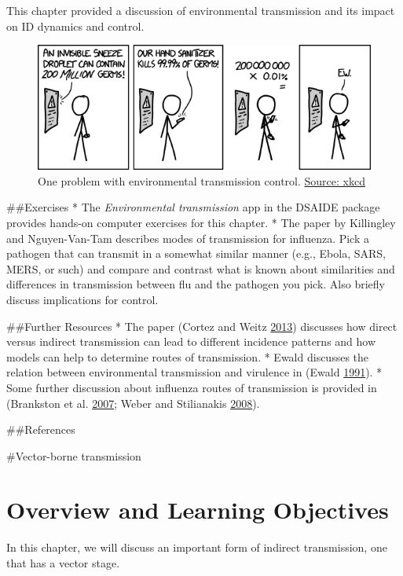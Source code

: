 \documentclass[]{book}
\theoremstyle{definition}
\theoremstyle{definition}
\theoremstyle{definition}
\theoremstyle{remark}
\begin{document}
This chapter provided a discussion of environmental transmission and its
impact on ID dynamics and control.

\begin{figure}
\centering
\includegraphics{./images/xkcd-hand_sanitizer.png}
\caption{One problem with environmental transmission control.
\href{https://xkcd.com/1161/}{Source: xkcd}}
\end{figure}

\#\#Exercises * The \emph{Environmental transmission} app in the DSAIDE
package provides hands-on computer exercises for this chapter. * The
paper by Killingley and Nguyen-Van-Tam describes modes of transmission
for influenza. Pick a pathogen that can transmit in a somewhat similar
manner (e.g., Ebola, SARS, MERS, or such) and compare and contrast what
is known about similarities and differences in transmission between flu
and the pathogen you pick. Also briefly discuss implications for
control.

\#\#Further Resources * The paper (Cortez and Weitz
\protect\hyperlink{ref-cortez13}{2013}) discusses how direct versus
indirect transmission can lead to different incidence patterns and how
models can help to determine routes of transmission. * Ewald discusses
the relation between environmental transmission and virulence in (Ewald
\protect\hyperlink{ref-ewald91}{1991}). * Some further discussion about
influenza routes of transmission is provided in (Brankston et al.
\protect\hyperlink{ref-brankston07}{2007}; Weber and Stilianakis
\protect\hyperlink{ref-weber08}{2008}).

\#\#References

\#Vector-borne transmission

\hypertarget{overview-and-learning-objectives-7}{%
\section{Overview and Learning
Objectives}\label{overview-and-learning-objectives-7}}

In this chapter, we will discuss an important form of indirect
transmission, one that has a vector stage.
\end{document}
